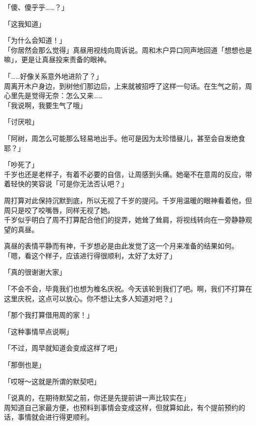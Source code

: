 「傻、傻乎乎……？」

「这我知道」

「为什么会知道！」\\

「你居然会那么觉得」真昼用视线向周诉说。周和木户异口同声地回道「想想也是嘛」，更是让真昼投来责备的眼神。\\

\vspace{2\baselineskip}

「……好像关系意外地进阶了？」\\

周离开木户身边，到树他们那边后，上来就被招呼了这样一句话。在生气之前，周心里先是觉得无奈：怎么又来……\\

「我说啊，我要生气了哦」

「讨厌啦」

「阿树，周怎么可能那么轻易地出手。他可是因为太珍惜昼儿，甚至会自发绝食耶？」

「吵死了」\\

千岁也还是老样子，有着不必要的自信，让周感到头痛。她毫不在意周的反应，带着轻快的笑容说「可是你无法否认吧？」

周打算对此保持沉默到底，所以无视了千岁的提问。千岁用温暖的眼神看着他，但周只是咬了咬嘴唇，同样无视了她。\\

千岁似乎明白了周不打算配合他们的捉弄，她耸了耸肩，将视线转向在一旁静静观望的真昼。

真昼的表情平静而有神，千岁想必是由此发觉了这一个月来准备的结果如何。\\

「嗯，看这个样子，应该进行得很顺利，太好了太好了」

「真的很谢谢大家」

「不会不会，毕竟我们也想为椎名庆祝。今天该轮到我们了吧。啊，我们不打算在这里庆祝，这点可以放心。你不想让太多人知道对吧？」

「那个我打算借用周的家！」

「这种事情早点说啊」

「不过，周早就知道会变成这样了吧」

「那倒也是」

「哎呀～这就是所谓的默契吧」

「说真的，在期待默契之前，你还是先提前讲一声比较实在」\\

周知道自己家最方便，也预料到事情会变成这样，但就算如此，有个提前预约的话，事情就会进行得更顺利。

